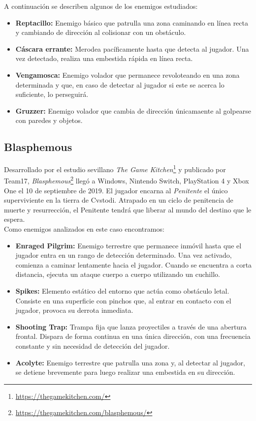 A continuación se describen algunos de los enemigos estudiados:
\begin{itemize}
	\item \textbf{Reptacillo:} Enemigo básico que patrulla una zona caminando en línea recta y cambiando de dirección al colisionar con un obstáculo.
	\item \textbf{Cáscara errante:} Merodea pacíficamente hasta que detecta al jugador. Una vez detectado, realiza una embestida rápida en línea recta. 
	\item \textbf{Vengamosca:} Enemigo volador que permanece revoloteando en una zona determinada y que, en caso de detectar al jugador si este se acerca lo suficiente, lo perseguirá.
	\item \textbf{Gruzzer:} Enemigo volador que cambia de dirección únicamaente al golpearse con paredes y objetos.
\end{itemize}

\subsection{Blasphemous}
Desarrollado por el estudio sevillano \emph{The Game Kitchen}\footnote{\url{https://thegamekitchen.com/}} y publicado por Team17, \textit{Blasphemous}\footnote{\url{https://thegamekitchen.com/blasphemous/}} llegó a Windows, Nintendo Switch, PlayStation 4 y Xbox One el 10 de septiembre de 2019. El jugador encarna al \textit{Penitente} el único superviviente en la tierra de Cvstodi. Atrapado en un ciclo de penitencia de muerte y resurrección, el Penitente tendrá que liberar al mundo del destino que le espera.\\

Como enemigos analizados en este caso encontramos:
\begin{itemize}
	\item \textbf{Enraged Pilgrim:} Enemigo terrestre que permanece inmóvil hasta que el jugador entra en un rango de detección determinado. Una vez activado, comienza a caminar lentamente hacia el jugador. Cuando se encuentra a corta distancia, ejecuta un ataque cuerpo a cuerpo utilizando un cuchillo.
	\item \textbf{Spikes:} Elemento estático del entorno que actúa como obstáculo letal. Consiste en una superficie con pinchos que, al entrar en contacto con el jugador, provoca su derrota inmediata. 
	\item \textbf{Shooting Trap:} Trampa fija que lanza proyectiles a través de una abertura frontal. Dispara de forma continua en una única dirección, con una frecuencia constante y sin necesidad de detección del jugador.
	\item \textbf{Acolyte:} Enemigo terrestre que patrulla una zona y, al detectar al jugador, se detiene brevemente para luego realizar una embestida en su dirección.
\end{itemize}


